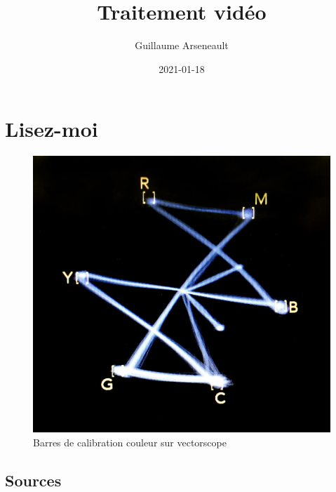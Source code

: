 \documentclass[
]{book}
\title{Traitement vidéo}
\author{Guillaume Arseneault}
\date{2021-01-18}
\begin{document}
\maketitle

{
\setcounter{tocdepth}{1}
\tableofcontents
}
\hypertarget{lisez-moi}{%
\chapter{Lisez-moi}\label{lisez-moi}}

\begin{figure}
\centering
\includegraphics{images/vectorscope.jpg}
\caption{\label{fig:unnamed-chunk-1}Barres de calibration couleur sur vectorscope \citep{marsh_ColorBarsVectorscope_2016}}
\end{figure}

\hypertarget{sources}{%
\section{Sources}\label{sources}}
\end{document}
